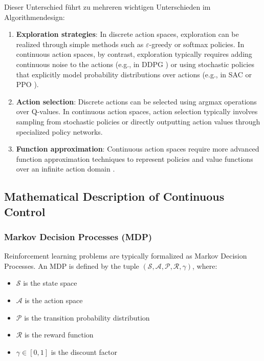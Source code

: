 \noindent Dieser Unterschied führt zu mehreren wichtigen Unterschieden im Algorithmendesign:

\begin{enumerate}
    \item \textbf{Exploration strategies}: In discrete action spaces, exploration can be realized through simple methods such as $\varepsilon$-greedy or softmax policies. In continuous action spaces, by contrast, exploration typically requires adding continuous noise to the actions (e.g., in DDPG \cite{lillicrap2019continuouscontroldeepreinforcement}) or using stochastic policies that explicitly model probability distributions over actions (e.g., in SAC \cite{haarnoja2018softactorcriticoffpolicymaximum} or PPO \cite{schulman2017proximalpolicyoptimizationalgorithms}).

    \item \textbf{Action selection}: Discrete actions can be selected using argmax operations over Q-values. In continuous action spaces, action selection typically involves sampling from stochastic policies or directly outputting action values through specialized policy networks.

    \item \textbf{Function approximation}: Continuous action spaces require more advanced function approximation techniques to represent policies and value functions over an infinite action domain \cite{fujimoto2018addressingfunctionapproximationerror}.
\end{enumerate}

\subsection{Mathematical Description of Continuous Control}

\subsubsection{Markov Decision Processes (MDP)}

Reinforcement learning problems are typically formalized as Markov Decision Processes. An MDP is defined by the tuple $(\mathcal{S}, \mathcal{A}, \mathcal{P}, \mathcal{R}, \gamma)$, where:

\begin{itemize}
    \item $\mathcal{S}$ is the state space
    \item $\mathcal{A}$ is the action space
    \item $\mathcal{P}$ is the transition probability distribution
    \item $\mathcal{R}$ is the reward function
    \item $\gamma \in [0,1]$ is the discount factor
\end{itemize}

